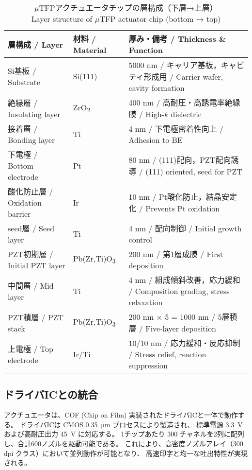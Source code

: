 \documentclass[conference]{IEEEtran}
\begin{document}
\begin{table*}[t]
  \centering
  \caption{%
    $\mu$TFPアクチュエータチップの層構成（下層→上層）\\
    Layer structure of $\mu$TFP actuator chip (bottom → top)
  }
  \label{tab:layer-structure}
  \begin{tabular}{lll}
    \hline
    \textbf{層構成 / Layer} & \textbf{材料 / Material} & \textbf{厚み・備考 / Thickness \& Function} \\
    \hline
    Si基板 / Substrate & Si(111) & 5000 nm / キャリア基板，キャビティ形成用 / Carrier wafer, cavity formation \\
    絶縁層 / Insulating layer & ZrO\textsubscript{2} & 400 nm / 高耐圧・高誘電率絶縁膜 / High-$k$ dielectric \\
    接着層 / Bonding layer & Ti & 4 nm / 下電極密着性向上 / Adhesion to BE \\
    下電極 / Bottom electrode & Pt & 80 nm / (111)配向，PZT配向誘導 / (111) oriented, seed for PZT \\
    酸化防止層 / Oxidation barrier & Ir & 10 nm / Pt酸化防止，結晶安定化 / Prevents Pt oxidation \\
    seed層 / Seed layer & Ti & 4 nm / 配向制御 / Initial growth control \\
    PZT初期層 / Initial PZT layer & Pb(Zr,Ti)O\textsubscript{3} & 200 nm / 第1層成膜 / First deposition \\
    中間層 / Mid layer & Ti & 4 nm / 組成傾斜改善，応力緩和 / Composition grading, stress relaxation \\
    PZT積層 / PZT stack & Pb(Zr,Ti)O\textsubscript{3} & 200 nm × 5 = 1000 nm / 5層積層 / Five-layer deposition \\
    上電極 / Top electrode & Ir/Ti & 10/10 nm / 応力緩和・反応抑制 / Stress relief, reaction suppression \\
    \hline
  \end{tabular}
\end{table*}

\subsection{ドライバICとの統合}
アクチュエータは、COF (Chip on Film) 実装されたドライバICと一体で動作する。
ドライバICは CMOS \SI{0.35}{\micro\metre} プロセスにより製造され、
標準電源 \SI{3.3}{V} および高耐圧出力 \SI{45}{V} に対応する。
1チップあたり 300 チャネルを2列に配列し、合計600ノズルを駆動可能である。
これにより、高密度ノズルアレイ（300\,dpi クラス）において並列動作が可能となり、
高速印字と均一な吐出特性が実現される。
\end{document}

